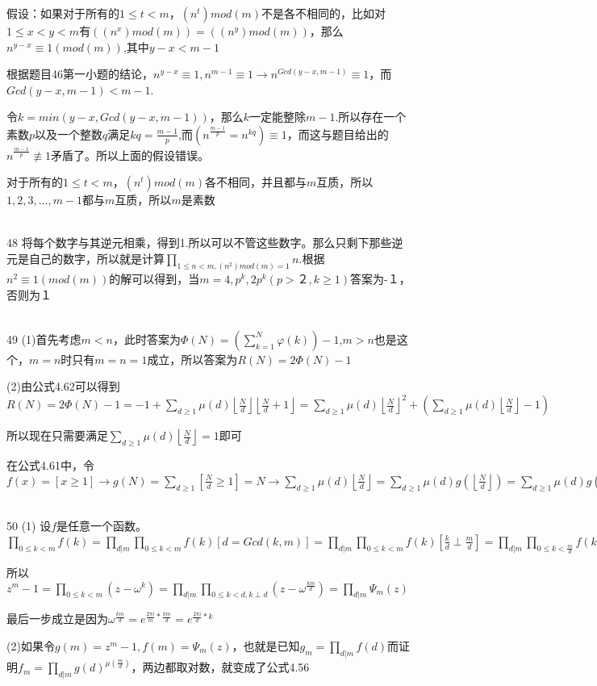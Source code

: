 \documentclass[onecolumn]{article}
\begin{document}
假设：如果对于所有的$1\leq t <m$，$\left (n^{t}  \right )mod(m)$不是各不相同的，比如对$1\leq x < y < m$有$\left ((n^{x})mod(m)  \right )=\left ((n^{y})mod(m)  \right )$，那么$n^{y-x}\equiv 1(mod(m))$,其中$y-x<m-1$ \par
根据题目46第一小题的结论，$n^{y-x}\equiv 1,n^{m-1}\equiv 1\rightarrow n^{Gcd(y-x,m-1)}\equiv 1$，而$Gcd(y-x,m-1)<m-1$.\par
令$k=min(y-x,Gcd(y-x,m-1))$，那么$k$一定能整除$m-1$.所以存在一个素数$p$以及一个整数$q$满足$kq=\frac{m-1}{p}$,而$\left ( n^{\frac{m-1}{p}}=n^{kq} \right )\equiv 1$，而这与题目给出的$n^{\frac{m-1}{p}}\not\equiv 1$矛盾了。所以上面的假设错误。\par 
对于所有的$1\leq t <m$，$\left (n^{t}  \right )mod(m)$各不相同，并且都与$m$互质，所以$1,2,3,...,m-1$都与$m$互质，所以$m$是素数 \par
~\\
48 将每个数字与其逆元相乘，得到1.所以可以不管这些数字。那么只剩下那些逆元是自己的数字，所以就是计算$\prod_{1\leq n < m,(n^{2})mod(m)=1}n$.根据$n^{2}\equiv 1(mod(m))$的解可以得到，当$m=4,p^{k},2p^{k}(p>２,k\geq 1)$答案为-１，否则为１ \par
~\\

49 (1)首先考虑$m<n$，此时答案为$\Phi (N)=\left (\sum_{k=1}^{N}\varphi (k)  \right )-1$,$m>n$也是这个，$m=n$时只有$m=n=1$成立，所以答案为$R(N)=2\Phi (N)-1$ \par
(2)由公式4.62可以得到$R(N)=2\Phi (N)-1=-1+\sum_{d\geq 1}\mu (d)\left \lfloor \frac{N}{d} \right \rfloor\left \lfloor \frac{N}{d}+1 \right \rfloor=\sum_{d\geq 1}\mu (d)\left \lfloor \frac{N}{d} \right \rfloor^{2}+\left (\sum_{d\geq 1}\mu (d)\left \lfloor \frac{N}{d} \right \rfloor-1  \right )$ \par
所以现在只需要满足$\sum_{d\geq 1}\mu (d)\left \lfloor \frac{N}{d} \right \rfloor=1$即可 \par
在公式4.61中，令$f(x)=[x\geq 1]\rightarrow g(N)=\sum_{d\geq 1}[\frac{N}{d}\geq 1]=N\rightarrow \sum_{d\geq 1}\mu (d)\left \lfloor \frac{N}{d} \right \rfloor=\sum_{d\geq 1}\mu (d)g(\left \lfloor \frac{N}{d} \right \rfloor)=\sum _{d\geq 1}\mu (d)g(\frac{N}{d})=f(N)=1$ \par
~\\
50 (1) 设$f$是任意一个函数。$\prod_{0\leq k < m}f(k)=\prod_{d|m}\prod_{0\leq k < m}f(k)[d=Gcd(k,m)]=\prod_{d|m}\prod_{0\leq k < m}f(k)[\frac{k}{d}\perp \frac{m}{d}]=\prod_{d|m}\prod_{0\leq k < \frac{m}{d}}f(kd)[k\perp \frac{m}{d}]=\prod_{d|m}\prod_{0\leq k < d}f(k\frac{m}{d})[k\perp d]$  \par
所以$z^{m}-1=\prod_{0\leq k < m}(z-\omega ^{k})=\prod_{d|m}\prod_{0\leq k < d,k\perp d}(z-\omega ^{\frac{km}{d}})=\prod_{d|m}\Psi _{m}(z)$ \par
最后一步成立是因为$\omega^{\frac{km}{d}}=e^{\frac{2\pi i}{m}*\frac{km}{d}}=e^{\frac{2\pi i}{d}*k}$ \par
(2)如果令$g(m)=z^{m}-1,f(m)=\Psi _{m}(z)$，也就是已知$g_{m}=\prod_{d|m}f(d)$而证明$f_{m}=\prod_{d|m}g(d)^{\mu (\frac{m}{d})}$，两边都取对数，就变成了公式4.56 \par
~\\
\end{document}
